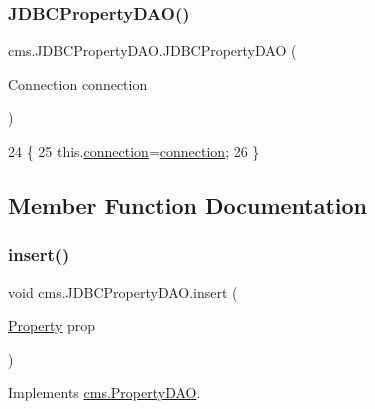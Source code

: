 \subsubsection{\texorpdfstring{J\+D\+B\+C\+Property\+D\+A\+O()}{JDBCPropertyDAO()}}
{\footnotesize\ttfamily cms.\+J\+D\+B\+C\+Property\+D\+A\+O.\+J\+D\+B\+C\+Property\+D\+AO (\begin{DoxyParamCaption}\item[{Connection}]{connection }\end{DoxyParamCaption})\hspace{0.3cm}{\ttfamily [inline]}}


\begin{DoxyCode}
24                                                  \{
25          this.\mbox{\hyperlink{classcms_1_1_j_d_b_c_property_d_a_o_abf9c487234968fce867ee559ed4ccd59}{connection}}=\mbox{\hyperlink{classcms_1_1_j_d_b_c_property_d_a_o_abf9c487234968fce867ee559ed4ccd59}{connection}};
26     \}
\end{DoxyCode}


\subsection{Member Function Documentation}
\mbox{\label{classcms_1_1_j_d_b_c_property_d_a_o_a5fc189c30f4112d03a6de691b1747667}} 
\subsubsection{\texorpdfstring{insert()}{insert()}}
{\footnotesize\ttfamily void cms.\+J\+D\+B\+C\+Property\+D\+A\+O.\+insert (\begin{DoxyParamCaption}\item[{\mbox{\hyperlink{classcms_1_1_property}{Property}}}]{prop }\end{DoxyParamCaption})\hspace{0.3cm}{\ttfamily [inline]}}



Implements \mbox{\hyperlink{interfacecms_1_1_property_d_a_o_a56361b7ac5be33a70e6d0651f9c42b27}{cms.\+Property\+D\+AO}}.


